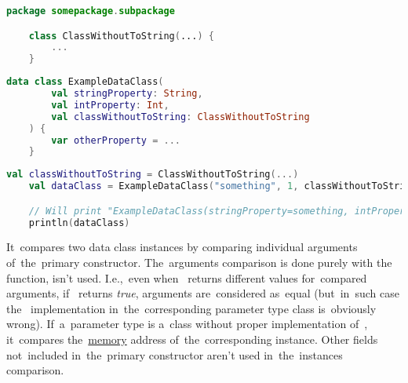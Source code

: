 \example
\begin{lstlisting}[language=Kotlin, title={Class without proper "toString" implementation}]
    package somepackage.subpackage

    class ClassWithoutToString(...) {
        ...
    }
\end{lstlisting}
\begin{lstlisting}[language=Kotlin, title={Data class}]
    data class ExampleDataClass(
        val stringProperty: String,
        val intProperty: Int,
        val classWithoutToString: ClassWithoutToString
    ) {
        var otherProperty = ...
    }
\end{lstlisting}
\newpage
\begin{lstlisting}[language=Kotlin, title={\itq{toString} behavior}]
    val classWithoutToString = ClassWithoutToString(...)
    val dataClass = ExampleDataClass("something", 1, classWithoutToString)

    // Will print "ExampleDataClass(stringProperty=something, intProperty=1, classWithoutToString= somepackage.subpackage.ClassWithoutToString@SOME_MESS)"
    println(dataClass)
\end{lstlisting}
\newline

\label{kotlindataclassequals}
It~compares two data class instances by comparing individual arguments of~the~primary constructor.
The~arguments comparison is done purely with \mbox{the } function,  isn't used.
I.e.,~even when~ returns different values for~compared arguments, \mbox{if } returns \textit{true}, arguments are~considered as~equal (but~in~such case \mbox{the } implementation in~the~corresponding parameter type class is~obviously wrong).
If~a~parameter type is a~class without proper implementation \mbox{of }, it~compares \mbox{the \hyperref[systemmemory]{memory}} address of~the~corresponding instance.
Other fields not~included in~the~primary constructor aren't used in~the~instances comparison.
\newline

